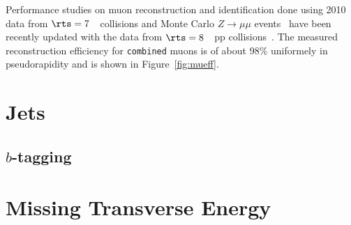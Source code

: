 Performance studies on muon reconstruction and identification done using 2010 data 
from $\rts=7$~\tev\ collisions and Monte Carlo $Z\to \mu\mu$ events~\cite{ATLAS-CONF-2011-063} 
have been recently updated with the data from $\rts=8$~\tev\ pp collisions~\cite{ATLAS-CONF-2013-088}.
The measured reconstruction efficiency for \texttt{combined} muons
is of about 98\% uniformely in pseudorapidity and 
is shown in Figure~\ref{fig:mueff}. 








\section{Jets}
\label{sec:jets}

\subsection{$b$-tagging}
\label{sec:btag}

\section{Missing Transverse Energy}
\label{sec:met}
